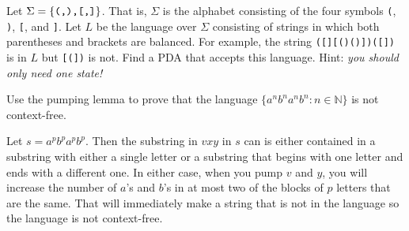\documentclass[12pt]{exam}
\newcommand{\N}{\mathbb{N}}
\begin{document}
\begin{questions}

\question Let $\Sigma = \{ \verb|(,),[,]| \}$. That is, $\Sigma$ is the alphabet consisting of the four symbols \verb|(|, \verb|)|, \verb|[|, and \verb|]|. Let $L$ be the language over $\Sigma$ consisting of strings in which both parentheses and brackets are balanced. For example, the string \verb|([][()()])([])| is in $L$ but \verb|[(])| is not. Find a PDA that accepts this language. Hint: \emph{you should only need one state!}
\vfill
\vfill
\vfill




\newpage


\question Use the pumping lemma to prove that the language $\{a^n b^n a^n b^n : n \in \N \}$ is not context-free. 
\begin{solution}
Let $s = a^p b^p a^p b^p$.  Then the substring in $vxy$ in $s$ can is either contained in a substring with either a single letter or a substring that begins with one letter and ends with a different one.  In either case, when you pump $v$ and $y$, you will increase the number of $a$'s and $b$'s in at most two of the blocks of $p$ letters that are the same.  That will immediately make a string that is not in the language so the language is not context-free. 
\end{solution}
\vfill


\end{questions}
\end{document}
